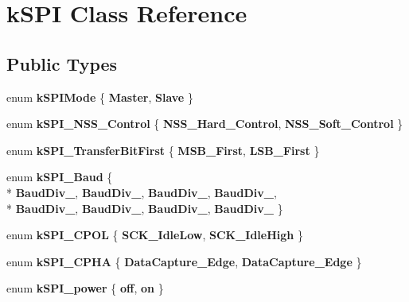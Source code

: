 \hypertarget{classkSPI}{}\section{k\+S\+PI Class Reference}
\label{classkSPI}
\subsection*{Public Types}
\begin{DoxyCompactItemize}
\item 
enum {\bfseries k\+S\+P\+I\+Mode} \{ {\bfseries Master}, 
{\bfseries Slave}
 \}\hypertarget{classkSPI_a3f875283cf2422b8b7213590599d2a54}{}\label{classkSPI_a3f875283cf2422b8b7213590599d2a54}

\item 
enum {\bfseries k\+S\+P\+I\+\_\+\+N\+S\+S\+\_\+\+Control} \{ {\bfseries N\+S\+S\+\_\+\+Hard\+\_\+\+Control}, 
{\bfseries N\+S\+S\+\_\+\+Soft\+\_\+\+Control}
 \}\hypertarget{classkSPI_af2847321cd94eccce2634b8edb193471}{}\label{classkSPI_af2847321cd94eccce2634b8edb193471}

\item 
enum {\bfseries k\+S\+P\+I\+\_\+\+Transfer\+Bit\+First} \{ {\bfseries M\+S\+B\+\_\+\+First}, 
{\bfseries L\+S\+B\+\_\+\+First}
 \}\hypertarget{classkSPI_ae4b5e7a7b02c6db8906b7a1ad4f56ad8}{}\label{classkSPI_ae4b5e7a7b02c6db8906b7a1ad4f56ad8}

\item 
enum {\bfseries k\+S\+P\+I\+\_\+\+Baud} \{ \\*
{\bfseries Baud\+Div\+\_}, 
{\bfseries Baud\+Div\+\_}, 
{\bfseries Baud\+Div\+\_}, 
{\bfseries Baud\+Div\+\_}, 
\\*
{\bfseries Baud\+Div\+\_}, 
{\bfseries Baud\+Div\+\_}, 
{\bfseries Baud\+Div\+\_}, 
{\bfseries Baud\+Div\+\_}
 \}\hypertarget{classkSPI_a015f6611cec7b59fbf631625d1cac0b2}{}\label{classkSPI_a015f6611cec7b59fbf631625d1cac0b2}

\item 
enum {\bfseries k\+S\+P\+I\+\_\+\+C\+P\+OL} \{ {\bfseries S\+C\+K\+\_\+\+Idle\+Low}, 
{\bfseries S\+C\+K\+\_\+\+Idle\+High}
 \}\hypertarget{classkSPI_ac532bae095b82181c9485a464d8209e1}{}\label{classkSPI_ac532bae095b82181c9485a464d8209e1}

\item 
enum {\bfseries k\+S\+P\+I\+\_\+\+C\+P\+HA} \{ {\bfseries Data\+Capture\+\_\+Edge}, 
{\bfseries Data\+Capture\+\_\+Edge}
 \}\hypertarget{classkSPI_aafaa3b8faa71a2d707da7bde204999d3}{}\label{classkSPI_aafaa3b8faa71a2d707da7bde204999d3}

\item 
enum {\bfseries k\+S\+P\+I\+\_\+power} \{ {\bfseries off}, 
{\bfseries on}
 \}\hypertarget{classkSPI_a37fdc25c9c10f284479c8b47198068fe}{}\label{classkSPI_a37fdc25c9c10f284479c8b47198068fe}

\end{DoxyCompactItemize}
